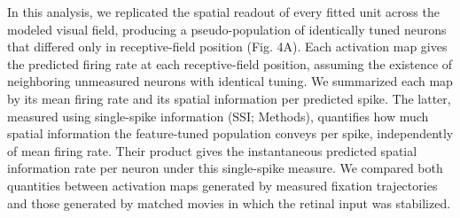 \documentclass{lite}
\begin{document}

In this analysis, we replicated the spatial readout of every fitted unit across the modeled visual field, producing a pseudo-population of identically tuned neurons that differed only in receptive-field position (Fig. 4A). Each activation map gives the predicted firing rate at each receptive-field position, assuming the existence of neighboring unmeasured neurons with identical tuning. We summarized each map by its mean firing rate and its spatial information per predicted spike. The latter, measured using single-spike information (SSI; Methods), quantifies how much spatial information the feature-tuned population conveys per spike, independently of mean firing rate. Their product gives the instantaneous predicted spatial information rate per neuron under this single-spike measure. We compared both quantities between activation maps generated by measured fixation trajectories and those generated by matched movies in which the retinal input was stabilized.

\end{document}
